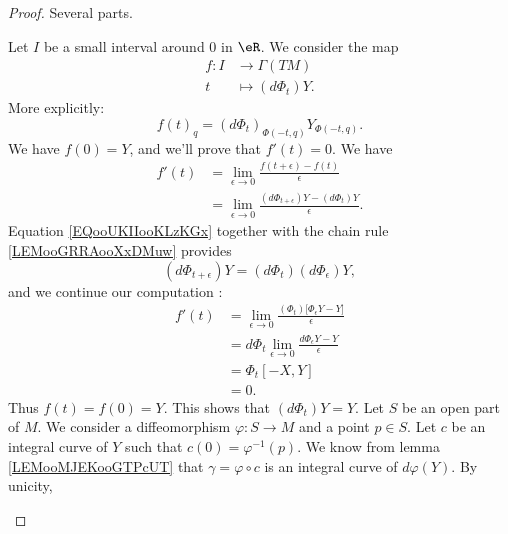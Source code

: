 \begin{proof}
	Several parts.
	\begin{subproof}
		\spitem[\ref{ITEMooMOCPooTlYzil} \( \Rightarrow\) \ref{ITEMooOSZCooLkFAaV}]
		Let \( I\) be a small interval around \( 0\) in \( \eR\). We consider the map
		\begin{equation}
			\begin{aligned}
				f\colon I & \to \Gamma(TM)      \\
				t         & \mapsto (d\Phi_t)Y.
			\end{aligned}
		\end{equation}
		More explicitly:
		\begin{equation}
			f(t)_q=(d\Phi_t)_{\Phi(-t,q)}Y_{\Phi(-t,q)}.
		\end{equation}
		We have \( f(0)=Y\), and we'll prove that \( f'(t)=0\). We have
		\begin{subequations}
			\begin{align}
				f'(t) & =\lim_{\epsilon\to 0}\frac{ f(t+\epsilon)-f(t) }{ \epsilon }                \\
				      & =\lim_{\epsilon\to 0}\frac{ (d\Phi_{t+\epsilon})Y-(d\Phi_t)Y }{ \epsilon }.
			\end{align}
		\end{subequations}
		Equation \eqref{EQooUKIIooKLzKGx} together with the chain rule \ref{LEMooGRRAooXxDMuw} provides
		\begin{equation}
			(d\Phi_{t+\epsilon})Y=(d\Phi_t)(d\Phi_{\epsilon})Y,
		\end{equation}
		and we continue our computation :
		\begin{subequations}
			\begin{align}
				f'(t) & =\lim_{\epsilon\to0}\frac{ (\Phi_t)\big[    \Phi_{\epsilon}Y-Y \big] }{ \epsilon } \\
				      & =d\Phi_t\lim_{\epsilon\to 0}\frac{ d\Phi_{\epsilon}Y-Y }{ \epsilon }               \\
				      & =\Phi_t[-X,Y]                                                                      \\
				      & =0.
			\end{align}
		\end{subequations}
		Thus \( f(t)=f(0)=Y\). This shows that \( (d\Phi_t)Y=Y\).
		\spitem[\ref{ITEMooOSZCooLkFAaV} \( \Rightarrow\) \ref{ITEMooZIRJooFNogYn}]
		Let \( S\) be an open part of \( M\). We consider a diffeomorphism \(\varphi \colon S\to M  \) and a point \( p\in S\). Let \( c\) be an integral curve of \( Y\) such that \( c(0)=\varphi^{-1}(p)\). We know from lemma \ref{LEMooMJEKooGTPcUT} that \( \gamma=\varphi\circ c\) is an integral curve of \( d\varphi(Y)\). By unicity,

\end{subproof}
\end{proof}
